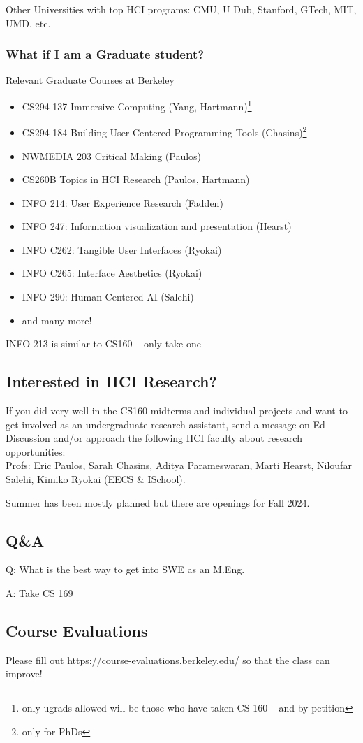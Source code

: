 Other Universities with top HCI programs: CMU, U Dub, Stanford, GTech, MIT,
UMD, etc.

\subsubsection{What if I am a Graduate student?}
Relevant Graduate Courses at Berkeley
\begin{itemize}
    \item CS294-137 Immersive Computing (Yang, Hartmann)\footnote{only ugrads allowed will be those who have taken CS 160 -- and by petition}
    \item CS294-184 Building User-Centered Programming Tools (Chasins)\footnote{only for PhDs}
    \item NWMEDIA 203 Critical Making (Paulos)
    \item CS260B Topics in HCI Research (Paulos, Hartmann)
    \item INFO 214: User Experience Research (Fadden)
    \item INFO 247: Information visualization and presentation (Hearst)
    \item INFO C262: Tangible User Interfaces (Ryokai)
    \item INFO C265: Interface Aesthetics (Ryokai)
    \item INFO 290: Human-Centered AI (Salehi)
    \item and many more!
\end{itemize}
\begin{important}
INFO 213 is similar to CS160 – only take one
\end{important}

\subsection{Interested in HCI Research?}
If you did very well in the CS160 midterms and
individual projects and want to get involved as an undergraduate research assistant, send a message on Ed Discussion and/or approach the following HCI faculty about research opportunities:\\
Profs: Eric Paulos, Sarah Chasins, Aditya Parameswaran, Marti Hearst, Niloufar Salehi, Kimiko Ryokai (EECS \& ISchool).

Summer has been mostly planned but there are
openings for Fall 2024.

\subsection{Q\&A}
\begin{shaded}
Q: What is the best way to get into SWE as an M.Eng.

A: Take CS 169
\end{shaded}

\subsection{Course Evaluations}
Please fill out \href{https://course-evaluations.berkeley.edu/}{https://course-evaluations.berkeley.edu/} so that the class can improve!
